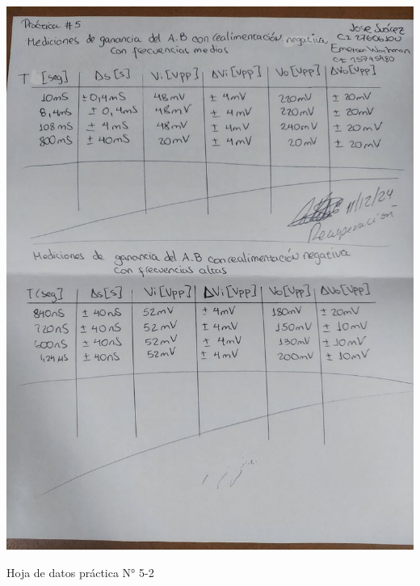 \begin{ilustracion}[ht]
    \centering
    \includegraphics[width=1.0\textwidth,angle=90]{src/images/p5/p5-hoja-de-datos-2.jpg}
    \caption{Hoja de datos práctica N° 5-2}
    \label{ilus:hoja-de-datos-p5-2}
\end{ilustracion}

